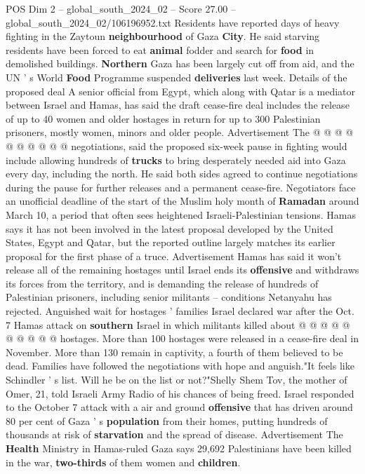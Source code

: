 \begin{textsample}{POS Dim 2 – global\_south\_2024\_02 – Score 27.00 – global\_south\_2024\_02/106196952.txt}
Residents have reported days of heavy fighting in the Zaytoun \textbf{neighbourhood} of Gaza \textbf{City}.
He said starving residents have been forced to eat \textbf{animal} fodder and search for \textbf{food} in demolished buildings. \textbf{Northern} Gaza has been largely cut off from aid, and the UN ' s World \textbf{Food} Programme suspended \textbf{deliveries} last week.
Details of the proposed deal A senior official from Egypt, which along with Qatar is a mediator between Israel and Hamas, has said the draft cease-fire deal includes the release of up to 40 women and older hostages in return for up to 300 Palestinian prisoners, mostly women, minors and older people.
Advertisement The @ @ @ @ @ @ @ @ @ @ negotiations, said the proposed six-week pause in fighting would include allowing hundreds of \textbf{trucks} to bring desperately needed aid into Gaza every day, including the north.
He said both sides agreed to continue negotiations during the pause for further releases and a permanent cease-fire.
Negotiators face an unofficial deadline of the start of the Muslim holy month of \textbf{Ramadan} around March 10, a period that often sees heightened Israeli-Palestinian tensions.
Hamas says it has not been involved in the latest proposal developed by the United States, Egypt and Qatar, but the reported outline largely matches its earlier proposal for the first phase of a truce.
Advertisement Hamas has said it won't release all of the remaining hostages until Israel ends its \textbf{offensive} and withdraws its forces from the territory, and is demanding the release of hundreds of Palestinian prisoners, including senior militants -- conditions Netanyahu has rejected.
Anguished wait for hostages ' families Israel declared war after the Oct. 7 Hamas attack on \textbf{southern} Israel in which militants killed about @ @ @ @ @ @ @ @ @ @ hostages.
More than 100 hostages were released in a cease-fire deal in November.
More than 130 remain in captivity, a fourth of them believed to be dead.
Families have followed the negotiations with hope and anguish."It feels like Schindler ' s list.
Will he be on the list or not?"Shelly Shem Tov, the mother of Omer, 21, told Israeli Army Radio of his chances of being freed.
Israel responded to the October 7 attack with a air and ground \textbf{offensive} that has driven around 80 per cent of Gaza ' s \textbf{population} from their homes, putting hundreds of thousands at risk of \textbf{starvation} and the spread of disease.
Advertisement The \textbf{Health} Ministry in Hamas-ruled Gaza says 29,692 Palestinians have been killed in the war, \textbf{two-thirds} of them women and \textbf{children}.

\end{textsample}
